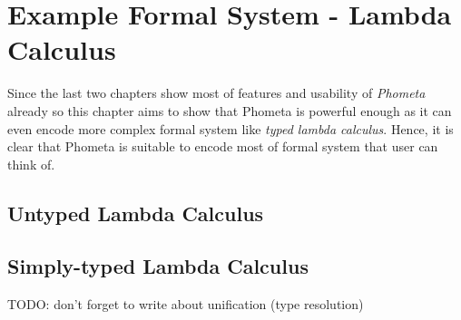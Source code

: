 \documentclass[master.tex]{subfiles}
\begin{document}
\chapter{Example Formal System - Lambda Calculus}
\label{chap:example_lambda_calculus}

Since the last two chapters show most of features and usability of \emph{Phometa}
already so this chapter aims to show that Phometa is powerful enough as it can
even encode more complex formal system like \emph{typed lambda calculus}. Hence,
it is clear that Phometa is suitable to encode most of formal system that user
can think of.

\section{Untyped Lambda Calculus}
\section{Simply-typed Lambda Calculus}

TODO: don't forget to write about unification (type resolution)
\end{document}
